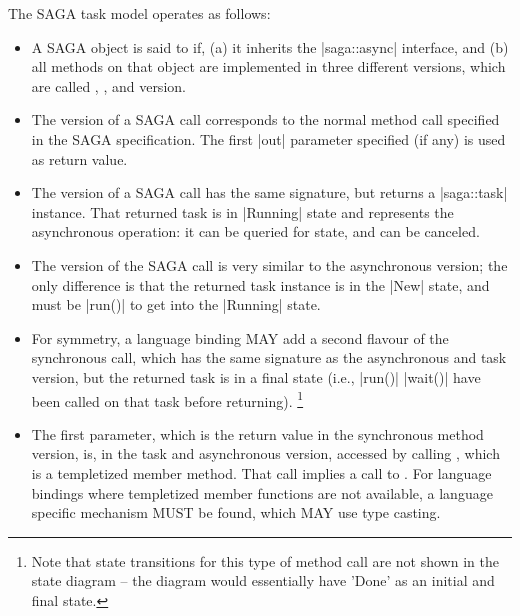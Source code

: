   The SAGA task model operates as follows:
 
 \begin{itemize}
   
   \item A SAGA object is said to  if, (a) it inherits the |saga::async| interface, and
   (b) all methods on that object are implemented in three
   different versions, which are called ,
   , and  version.
 
   \item The  version of a SAGA call corresponds
   to the normal method call specified in the SAGA
   specification.  The first |out| parameter specified (if any)
   is used as return value.
 
   \item The  version of a SAGA
   call has the same signature, but 
   returns a
   |saga::task| instance.  That returned task is in |Running|
   state and represents the asynchronous operation: it can be
   queried for state, and can be canceled.
 
   \item The  version of the SAGA call is very similar to
   the asynchronous version; the only difference is that the
   returned task instance is in the |New| state, and must
   be |run()| to get into the |Running| state.
 
   \item For symmetry, a language binding MAY add a second
   flavour of the synchronous call, which has the same signature
   as the asynchronous and task version, but the
   returned task is in a final state (i.e., |run()| 
   |wait()| have been called on that task before returning).
   \footnote{Note that state transitions for this type of method
   call are not shown in the state diagram -- the diagram would
   essentially have 'Done' as an initial
   and final state.}
 
   \item The first  parameter, which is the
   return value in the synchronous method version, is, in the
   task and asynchronous version, accessed by calling
   , which is a
   templetized member method.  That call implies a call to
   .  For language bindings where templetized member
   functions are not available, a language specific mechanism
   MUST be found, which MAY use type casting.
 

\end{itemize}

